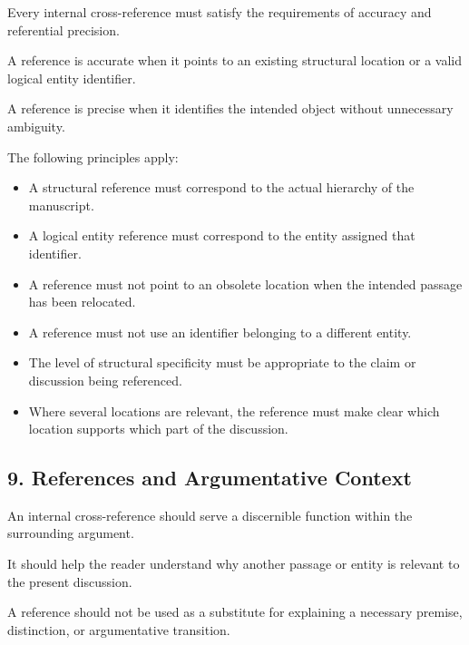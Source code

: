 Every internal cross-reference
must satisfy the requirements
of accuracy and referential precision.

A reference is accurate when it
points to an existing structural
location or a valid logical entity
identifier.

A reference is precise when it
identifies the intended object
without unnecessary ambiguity.

The following principles apply:

\begin{itemize}
    \item A structural reference must
    correspond to the actual hierarchy
    of the manuscript.

    \item A logical entity reference
    must correspond to the entity
    assigned that identifier.

    \item A reference must not point
    to an obsolete location when
    the intended passage has been
    relocated.

    \item A reference must not use
    an identifier belonging to
    a different entity.

    \item The level of structural
    specificity must be appropriate
    to the claim or discussion
    being referenced.

    \item Where several locations
    are relevant, the reference
    must make clear which location
    supports which part of the
    discussion.
\end{itemize}


\subsection*{9. References and Argumentative Context}

An internal cross-reference should
serve a discernible function within
the surrounding argument.

It should help the reader understand
why another passage or entity is
relevant to the present discussion.

A reference should not be used as
a substitute for explaining a
necessary premise, distinction,
or argumentative transition.

